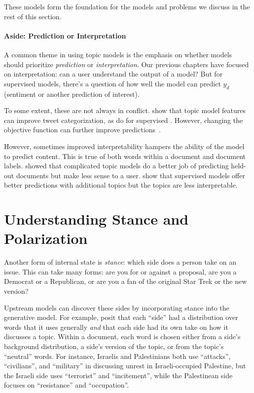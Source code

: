 These models form the foundation for the models and problems we
discuss in the rest of this section.

\paragraph{Aside: Prediction or Interpretation}

A common theme in using topic models is the emphasis on whether models
should prioritize \emph{prediction} or \emph{interpretation}.  Our
previous chapters have focused on interpretation: can a user
understand the output of a model?  But for supervised models, there's
a question of how well the model can predict $y_d$ (sentiment or
another prediction of interest).  

To some extent, these are not always in conflict.  \citet{ramage-10b}
show that topic model features can improve tweet categorization, as
do \citet{blei-07b} for supervised .  However, changing the
objective function can further improve predictions~\citep{zhu-09}.

However, sometimes improved interpretability hampers the ability of
the model to predict content.  This is true of both words within a
document and document labels.  \citet{chang-09b} showed that
complicated topic models do a better job of predicting held-out
documents but make less sense to a user.  \citet{Nguyen-15:anchor}
show that supervised models offer better predictions with additional
topics but the topics are less interpretable.

\section{Understanding Stance and Polarization}

Another form of internal state is \emph{stance}: which side does a
person take on an issue.  This can take many forms: are you for or
against a proposal, are you a Democrat or a Republican, or are you a
fan of the original Star Trek or the new version?

Upstream models can discover these sides by incorporating stance into
the generative model.  For example, \citet{paul-10} posit that each
``side'' had a distribution over words that it uses generally
\emph{and} that each side had its own take on how it discusses a
topic.  Within a document, each word is chosen either from a side's
background distribution, a side's version of the topic, or from the
topic's ``neutral'' words.  For instance, Israelis and Palestinians
both use ``attacks'', ``civilians'', and ``military'' in discussing
unrest in Israeli-occupied Palestine, but the Israeli side uses
``terrorist'' and ``incitement'', while the Palestinean side focuses
on ``resistance'' and ``occupation''.

